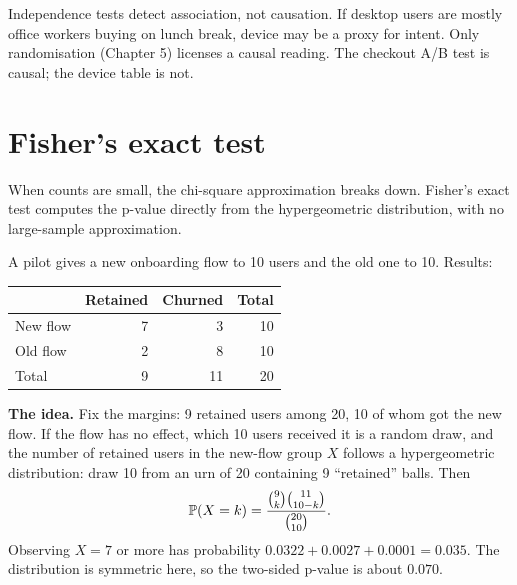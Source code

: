 \begin{trapbox}
Independence tests detect association, not causation. If desktop users are
mostly office workers buying on lunch break, device may be a proxy for intent.
Only randomisation (Chapter 5) licenses a causal reading. The checkout A/B test
is causal; the device table is not.
\end{trapbox}

\section{Fisher's exact test}
\label{sec:cg-fisher}

When counts are small, the chi-square approximation breaks down. Fisher's exact
test computes the p-value directly from the hypergeometric distribution, with no
large-sample approximation.

A pilot gives a new onboarding flow to 10 users and the old one to 10. Results:

\begin{center}
\begin{tabular}{lrr|r}
\toprule
 & Retained & Churned & Total \\
\midrule
New flow & 7 & 3 & 10 \\
Old flow & 2 & 8 & 10 \\
\midrule
Total & 9 & 11 & 20 \\
\bottomrule
\end{tabular}
\end{center}

\textbf{The idea.} Fix the margins: 9 retained users among 20, 10 of whom got the
new flow. If the flow has no effect, which 10 users received it is a random
draw, and the number of retained users in the new-flow group $X$ follows a
hypergeometric distribution: draw 10 from an urn of 20 containing 9 ``retained''
balls. Then
\[
  \P(X = k) = \frac{\binom{9}{k}\binom{11}{10-k}}{\binom{20}{10}}.
\]
Observing $X = 7$ or more has probability
$0.0322 + 0.0027 + 0.0001 = 0.035$. The distribution is symmetric here, so the
two-sided p-value is about $0.070$.

